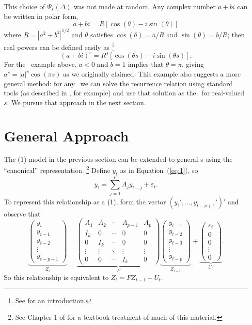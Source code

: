 \documentclass[12pt,fleqn]{article}
\newcommand{\vep}{\varepsilon}
\newcommand{\AR}{\allcaps{AR}}
\begin{document}
This choice of $\Psi_s(\Delta)$ was not made at random. Any complex
number $a + bi$ can be written in polar form,
\[
a + bi = R [\cos(\theta) - i \sin(\theta)]
\]
where $R = |a^2 + b^2|^{1/2}$ and $\theta$ satisfies $\cos(\theta) = a/R$ and
$\sin(\theta) = b/R$; then real powers can be defined easily as%
\footnote{See \citet{Ham:94} for an introduction.} %
\[
(a + bi)^s = R^s [\cos(\theta s) - i \sin(\theta s)].
\]
For the \AR\ example above, $a < 0$ and $b = 1$ implies that $\theta =
\pi$, giving $a^s = |a|^s \cos(\pi s)$ as we originally claimed. This
example also suggests a more general method: for any \VAR\ we can
solve the recurrence relation using standard tools (as described in
\citealp{Ham:94}, for example) and use that solution as the \IRF\ for
real-valued $s$. We pursue that approach in the next section.

\section{General Approach}\label{recommended}

The \AR(1) model in the previous section can be extended to general
\VAR s using the ``canonical'' representation.%
\footnote{See Chapter 1 of \citet{Ham:94} for a textbook treatment of
  much of this material.} %
Define $y_t$ as in Equation~(\ref{eq:1}), so
\[
y_t = \sum_{j=1}^p A_j y_{t-j} + \vep_t.
\]
To represent this relationship as a \VAR(1), form the vector
$(y_t',\dots,y_{t-p+1}')'$ and observe that
\[
\underbrace{\begin{pmatrix}
  y_t \\ y_{t-1} \\ y_{t-2} \\ \vdots \\ y_{t-p+1}
\end{pmatrix}}_{Z_t}
=
\underbrace{\begin{pmatrix}
  A_1 & A_2 & \cdots & A_{p-1} & A_p \\
  I_k & 0   & \cdots & 0 & 0 \\
  0  & I_k  & \cdots & 0 & 0 \\
  \vdots & \vdots & \ddots & \vdots & \vdots \\
  0 & 0 & \cdots & I_k & 0
\end{pmatrix}}_{F}
\underbrace{\begin{pmatrix}
  y_{t-1} \\ y_{t-2} \\ y_{t-3} \\ \vdots \\ y_{t-p}
\end{pmatrix}}_{Z_{t-1}}
+
\underbrace{\begin{pmatrix}
  \vep_{t} \\ 0 \\ 0 \\ \vdots \\ 0
\end{pmatrix}}_{U_t}.
\]
So this relationship is equivalent to $Z_t = F Z_{t-1} + U_t$.
\end{document}
